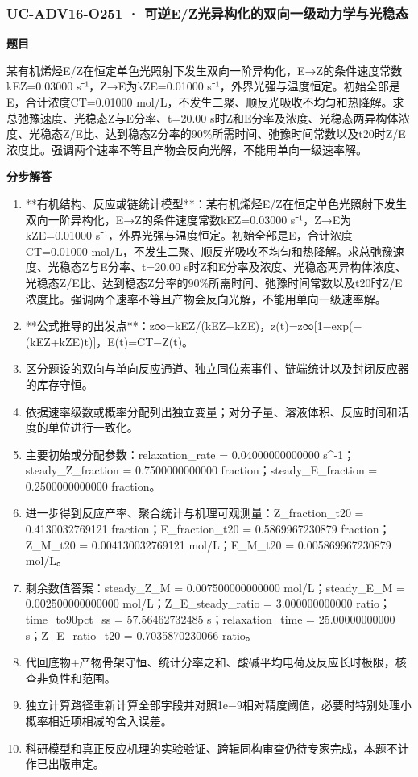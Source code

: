 \documentclass[UTF8,11pt,a4paper]{ctexart}
\begin{document}
\subsubsection*{UC-ADV16-O251 · 可逆E/Z光异构化的双向一级动力学与光稳态}
\noindent\textbf{题目}\par
某有机烯烃E/Z在恒定单色光照射下发生双向一阶异构化，E→Z的条件速度常数kEZ=0.03000 s⁻¹，Z→E为kZE=0.01000 s⁻¹，外界光强与温度恒定。初始全部是E，合计浓度CT=0.01000 mol/L，不发生二聚、顺反光吸收不均匀和热降解。求总弛豫速度、光稳态Z与E分率、t=20.00 s时Z和E分率及浓度、光稳态两异构体浓度、光稳态Z/E比、达到稳态Z分率的90\%所需时间、弛豫时间常数以及t20时Z/E浓度比。强调两个速率不等且产物会反向光解，不能用单向一级速率解。\par
\medskip\noindent\textbf{分步解答}
\begin{enumerate}
\item **有机结构、反应或链统计模型**：某有机烯烃E/Z在恒定单色光照射下发生双向一阶异构化，E→Z的条件速度常数kEZ=0.03000 s⁻¹，Z→E为kZE=0.01000 s⁻¹，外界光强与温度恒定。初始全部是E，合计浓度CT=0.01000 mol/L，不发生二聚、顺反光吸收不均匀和热降解。求总弛豫速度、光稳态Z与E分率、t=20.00 s时Z和E分率及浓度、光稳态两异构体浓度、光稳态Z/E比、达到稳态Z分率的90\%所需时间、弛豫时间常数以及t20时Z/E浓度比。强调两个速率不等且产物会反向光解，不能用单向一级速率解。
\item **公式推导的出发点**：z∞=kEZ/(kEZ+kZE)，z(t)=z∞[1−exp(−(kEZ+kZE)t)]，E(t)=CT−Z(t)。
\item 区分题设的双向与单向反应通道、独立同位素事件、链端统计以及封闭反应器的库存守恒。
\item 依据速率级数或概率分配列出独立变量；对分子量、溶液体积、反应时间和活度的单位进行一致化。
\item 主要初始或分配参数：relaxation\_rate = 0.04000000000000 s\textasciicircum{}-1；steady\_Z\_fraction = 0.7500000000000 fraction；steady\_E\_fraction = 0.2500000000000 fraction。
\item 进一步得到反应产率、聚合统计与机理可观测量：Z\_fraction\_t20 = 0.4130032769121 fraction；E\_fraction\_t20 = 0.5869967230879 fraction；Z\_M\_t20 = 0.004130032769121 mol/L；E\_M\_t20 = 0.005869967230879 mol/L。
\item 剩余数值答案：steady\_Z\_M = 0.007500000000000 mol/L；steady\_E\_M = 0.002500000000000 mol/L；Z\_E\_steady\_ratio = 3.000000000000 ratio；time\_to90pct\_ss = 57.56462732485 s；relaxation\_time = 25.00000000000 s；Z\_E\_ratio\_t20 = 0.7035870230066 ratio。
\item 代回底物+产物骨架守恒、统计分率之和、酸碱平均电荷及反应长时极限，核查非负性和范围。
\item 独立计算路径重新计算全部字段并对照1e−9相对精度阈值，必要时特别处理小概率相近项相减的舍入误差。
\item 科研模型和真正反应机理的实验验证、跨辑同构审查仍待专家完成，本题不计作已出版审定。
\end{enumerate}
\end{document}
